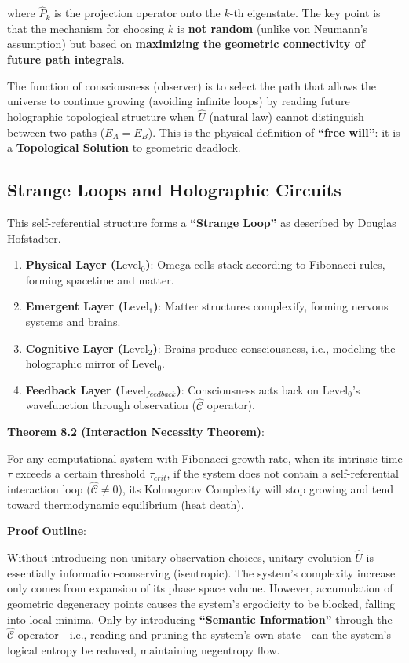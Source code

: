 where $\hat{P}_k$ is the projection operator onto the $k$-th eigenstate.
The key point is that the mechanism for choosing $k$ is \textbf{not random} (unlike von Neumann's assumption) but based on \textbf{maximizing the geometric connectivity of future path integrals}.

The function of consciousness (observer) is to select the path that allows the universe to continue growing (avoiding infinite loops) by reading future holographic topological structure when $\hat{U}$ (natural law) cannot distinguish between two paths ($E_A = E_B$). This is the physical definition of \textbf{``free will''}: it is a \textbf{Topological Solution} to geometric deadlock.

\subsection{Strange Loops and Holographic Circuits}

This self-referential structure forms a \textbf{``Strange Loop''} as described by Douglas Hofstadter.

\begin{enumerate}
\item \textbf{Physical Layer ($\text{Level}_0$)}: Omega cells stack according to Fibonacci rules, forming spacetime and matter.
\item \textbf{Emergent Layer ($\text{Level}_1$)}: Matter structures complexify, forming nervous systems and brains.
\item \textbf{Cognitive Layer ($\text{Level}_2$)}: Brains produce consciousness, i.e., modeling the holographic mirror of $\text{Level}_0$.
\item \textbf{Feedback Layer ($\text{Level}_{feedback}$)}: Consciousness acts back on $\text{Level}_0$'s wavefunction through observation ($\hat{\mathcal{C}}$ operator).
\end{enumerate}

\textbf{Theorem 8.2 (Interaction Necessity Theorem)}:

For any computational system with Fibonacci growth rate, when its intrinsic time $\tau$ exceeds a certain threshold $\tau_{crit}$, if the system does not contain a self-referential interaction loop ($\hat{\mathcal{C}} \neq 0$), its Kolmogorov Complexity will stop growing and tend toward thermodynamic equilibrium (heat death).

\textbf{Proof Outline}:

Without introducing non-unitary observation choices, unitary evolution $\hat{U}$ is essentially information-conserving (isentropic). The system's complexity increase only comes from expansion of its phase space volume. However, accumulation of geometric degeneracy points causes the system's ergodicity to be blocked, falling into local minima. Only by introducing \textbf{``Semantic Information''} through the $\hat{\mathcal{C}}$ operator---i.e., reading and pruning the system's own state---can the system's logical entropy be reduced, maintaining negentropy flow.

